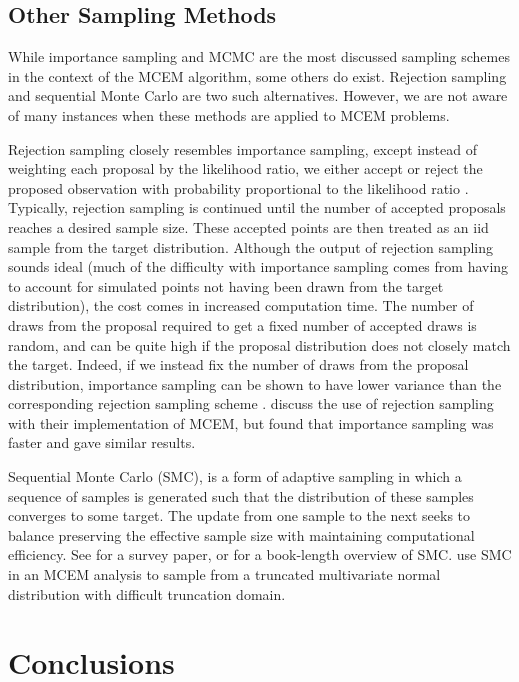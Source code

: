 \documentclass[11pt, oneside]{article}   	%
\begin{document}
\subsection{Other Sampling Methods}

While importance sampling and MCMC are the most discussed sampling schemes in the context of the MCEM algorithm, some others do exist. Rejection sampling and sequential Monte Carlo are two such alternatives. However, we are not aware of many instances when these methods are applied to MCEM problems.

Rejection sampling closely resembles importance sampling, except instead of weighting each proposal by the likelihood ratio, we either accept or reject the proposed observation with probability proportional to the likelihood ratio \citep{Cho20}. Typically, rejection sampling is continued until the number of accepted proposals reaches a desired sample size. These accepted points are then treated as an iid sample from the target distribution. Although the output of rejection sampling sounds ideal (much of the difficulty with importance sampling comes from having to account for simulated points not having been drawn from the target distribution), the cost comes in increased computation time. The number of draws from the proposal required to get a fixed number of accepted draws is random, and can be quite high if the proposal distribution does not closely match the target. Indeed, if we instead fix the number of draws from the proposal distribution, importance sampling can be shown to have lower variance than the corresponding rejection sampling scheme \citep[see Section 8.8 of][]{Cho20}. \citet{Boo99} discuss the use of rejection sampling with their implementation of MCEM, but found that importance sampling was faster and gave similar results.

Sequential Monte Carlo (SMC), is a form of adaptive sampling in which a sequence of samples is generated such that the distribution of these samples converges to some target. The update from one sample to the next seeks to balance preserving the effective sample size with maintaining computational efficiency. See \citet{Del06} for a survey paper, or \citet{Cho20} for a book-length overview of SMC. \citet{Mof14} use SMC in an MCEM analysis to sample from a truncated multivariate normal distribution with difficult truncation domain.


\section{Conclusions}
\label{sec2:conc}
\end{document}
